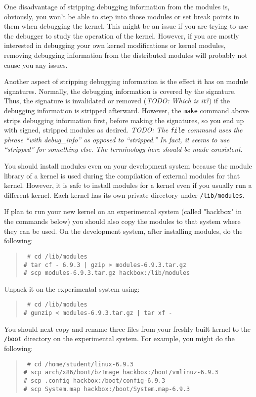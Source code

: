 \documentclass{article}
\newcommand{\command}[1]{\texttt{#1}}
\newcommand{\filename}[1]{\texttt{#1}}
\newcommand{\todo}[1]{\textit{TODO: #1}}
\newenvironment{commands}
  {\begin{quote} \tt}
  {\end{quote}}
\begin{document}
One disadvantage of stripping debugging information from the modules is, obviously, you won't be
able to step into those modules or set break points in them when debugging the kernel. This
might be an issue if you are trying to use the debugger to study the operation of the kernel.
However, if you are mostly interested in debugging your own kernel modifications or kernel
modules, removing debugging information from the distributed modules will probably not cause you
any issues.

Another aspect of stripping debugging information is the effect it has on module signatures.
Normally, the debugging information is covered by the signature. Thus, the signature is
invalidated or removed (\todo{Which is it?}) if the debugging information is stripped afterward.
However, the \command{make} command above strips debugging information first, before making the
signatures, so you end up with signed, stripped modules as desired. \todo{The \command{file}
  command uses the phrase ``with debug\_info'' as opposed to ``stripped.'' In fact, it seems to
  use ``stripped'' for something else. The terminology here should be made consistent.}

You should install modules even on your development system because the module library of a
kernel is used during the compilation of external modules for that kernel. However, it is safe
to install modules for a kernel even if you usually run a different kernel. Each kernel has its
own private directory under \filename{/lib/modules}.

If plan to run your new kernel on an experimental system (called "hackbox" in the commands
below) you should also copy the modules to that system where they can be used. On the
development system, after installing modules, do the following:
\begin{commands}
  \# cd /lib/modules \\
  \# tar cf - 6.9.3 | gzip > modules-6.9.3.tar.gz \\
  \# scp modules-6.9.3.tar.gz hackbox:/lib/modules
\end{commands}

Unpack it on the experimental system using:
\begin{commands}
  \# cd /lib/modules \\
  \# gunzip < modules-6.9.3.tar.gz | tar xf -
\end{commands}

You should next copy and rename three files from your freshly built kernel to the
\filename{/boot} directory on the experimental system. For example, you might do the following:
\begin{commands}
  \# cd /home/student/linux-6.9.3 \\
  \# scp arch/x86/boot/bzImage hackbox:/boot/vmlinuz-6.9.3 \\
  \# scp .config hackbox:/boot/config-6.9.3 \\
  \# scp System.map hackbox:/boot/System.map-6.9.3
\end{commands}
\end{document}
